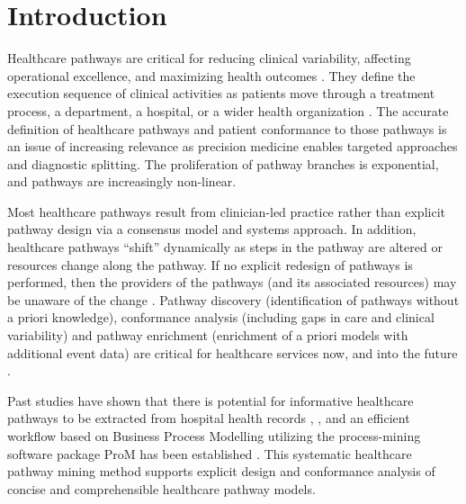 \section{Introduction}
Healthcare pathways are critical for reducing clinical variability, affecting operational excellence, and maximizing health outcomes \cite{Lin2001}. They define the execution sequence of clinical activities as patients move through a treatment process, a department, a hospital, or a wider health organization %
\cite{Huang2016}. The accurate definition of healthcare pathways and patient conformance to those pathways is an issue of increasing relevance as precision medicine enables targeted approaches and diagnostic splitting. The proliferation of pathway branches is exponential, and pathways are increasingly non-linear. 

Most healthcare pathways result from clinician-led practice rather than explicit pathway design via a consensus model and systems approach. In addition, healthcare pathways “shift” dynamically as steps in the pathway are altered or resources change along the pathway. If no explicit redesign of pathways is performed, then the providers of the pathways (and its associated resources) may be unaware of the change \cite{Zhang2015}. Pathway discovery (identification of pathways without a priori knowledge), conformance analysis (including gaps in care and clinical variability) and pathway enrichment (enrichment of a priori models with additional event data) are critical for healthcare services now, and into the future \cite{Baker2017}.

Past studies have shown that there is potential for informative
healthcare pathways to be extracted from hospital health records
\cite{Xu2017}, \cite{Iwata2013}, and an efficient workflow based on
Business Process Modelling utilizing the process-mining software
package ProM \cite{VanDongen2005} has been established
\cite{Mans2015_pathways, Neira2019_pathways}.
This systematic healthcare pathway mining method supports
explicit design and conformance analysis of concise and comprehensible
healthcare pathway models.


